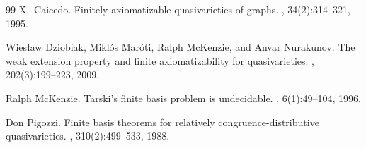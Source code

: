\documentclass[a4paper]{article} %
\begin{document}
\begin{thebibliography}{99}
X.~Caicedo.
\newblock Finitely axiomatizable quasivarieties of graphs.
, 34(2):314--321, 1995.

Wies{\l}aw Dziobiak, Mikl{\'o}s Mar{\'o}ti, Ralph McKenzie, and Anvar
  Nurakunov.
\newblock The weak extension property and finite axiomatizability for
  quasivarieties.
, 202(3):199--223, 2009.

Ralph McKenzie.
\newblock Tarski's finite basis problem is undecidable.
, 6(1):49--104, 1996.

Don Pigozzi.
\newblock Finite basis theorems for relatively congruence-distributive
  quasivarieties.
, 310(2):499--533, 1988.


\end{thebibliography}
\end{document}
